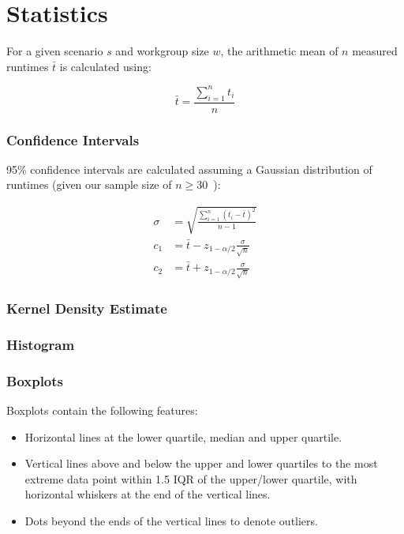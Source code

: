 \section{Statistics}

For a given scenario $s$ and workgroup size $w$, the arithmetic mean
of $n$ measured runtimes $\bar{t}$ is calculated using:

\begin{equation}
\bar{t} = \frac{\sum_{i=1}^{n}t_i}{n}
\end{equation}

\subsubsection{Confidence Intervals}

95\% confidence intervals are calculated assuming a Gaussian
distribution of runtimes (given our sample size of
$n \ge 30$~\cite{Georges2007}):

\begin{align}
\sigma &= \sqrt{\frac{\sum_{i=1}^{n}(t_i - \bar{t})^2}{n - 1}}\\
c_1 &= \bar{t} - z_{1-\alpha/2}\frac{\sigma}{\sqrt{n}}\\
c_2 &= \bar{t} + z_{1-\alpha/2}\frac{\sigma}{\sqrt{n}}
\end{align}


\subsubsection{Kernel Density Estimate}

\subsubsection{Histogram}

\subsubsection{Boxplots}

Boxplots contain the following features:

\begin{itemize}
\item Horizontal lines at the lower quartile, median and upper
  quartile.
\item Vertical lines above and below the upper and lower quartiles to
  the most extreme data point within 1.5 IQR of the upper/lower
  quartile, with horizontal whiskers at the end of the vertical lines.
\item Dots beyond the ends of the vertical lines to denote outliers.
\end{itemize}


